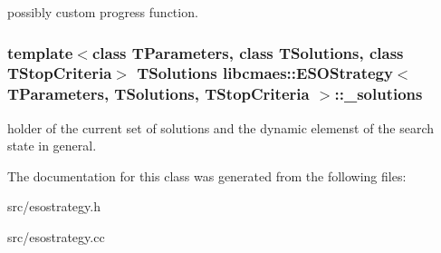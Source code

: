 possibly custom progress function. \hypertarget{classlibcmaes_1_1ESOStrategy_a8fe0f8dc2201951e9e4ed2768b5a09ab}{
\subsubsection[{\-\_\-solutions}]{\setlength{\rightskip}{0pt plus 5cm}template$<$class T\-Parameters, class T\-Solutions, class T\-Stop\-Criteria$>$ T\-Solutions {\bf libcmaes\-::\-E\-S\-O\-Strategy}$<$ T\-Parameters, T\-Solutions, T\-Stop\-Criteria $>$\-::\-\_\-solutions}}\label{classlibcmaes_1_1ESOStrategy_a8fe0f8dc2201951e9e4ed2768b5a09ab}
holder of the current set of solutions and the dynamic elemenst of the search state in general. 

The documentation for this class was generated from the following files\-:\begin{DoxyCompactItemize}
\item 
src/esostrategy.\-h\item 
src/esostrategy.\-cc\end{DoxyCompactItemize}
